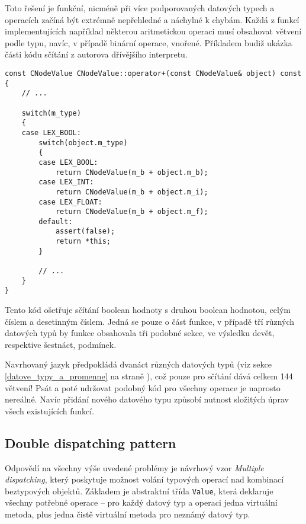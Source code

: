 \documentclass[11pt,twoside,a4paper]{book}
\begin{document}
Toto řešení je funkční, nicméně při více podporovaných datových typech a operacích začíná být extrémně nepřehledné a náchylné k chybám. Každá z funkcí implementujících například některou aritmetickou operaci musí obsahovat větvení podle typu, navíc, v případě binární operace, vnořené. Příkladem budiž ukázka části kódu sčítání z autorova dřívějšího interpretu.



\begin{verbatim}
const CNodeValue CNodeValue::operator+(const CNodeValue& object) const
{
    // ...

    switch(m_type)
    {
    case LEX_BOOL:
        switch(object.m_type)
        {
        case LEX_BOOL:
            return CNodeValue(m_b + object.m_b);
        case LEX_INT:
            return CNodeValue(m_b + object.m_i);
        case LEX_FLOAT:
            return CNodeValue(m_b + object.m_f);
        default:
            assert(false);
            return *this;
        }

        // ...
    }
}
\end{verbatim}

Tento kód ošetřuje sčítání boolean hodnoty s druhou boolean hodnotou, celým číslem a desetinným číslem. Jedná se pouze o část funkce, v případě tří různých datových typů by funkce obsahovala tři podobné sekce, ve výsledku devět, respektive šestnáct, podmínek.

Navrhovaný jazyk předpokládá dvanáct různých datových typů (viz sekce \ref{datove_typy_a_promenne} na straně \pageref{datove_typy_a_promenne}), což pouze pro sčítání dává celkem 144 větvení! Psát a poté udržovat podobný kód pro všechny operace je naprosto nereálné. Navíc přidání nového datového typu způsobí nutnost slo\-ži\-tých úprav všech existujících funkcí.


\subsection{Double dispatching pattern}
\label{double_dispatching_pattern}


Odpovědí na všechny výše uvedené problémy je návrhový vzor \textit{Multiple dispatching}, který poskytuje možnost volání typových operací nad kombinací beztypových objektů. Základem je abstraktní třída \texttt{Value}, která deklaruje všechny potřebné operace -- pro každý datový typ a operaci jedna virtuální metoda, plus jedna čistě virtuální metoda pro neznámý datový typ.
\end{document}
